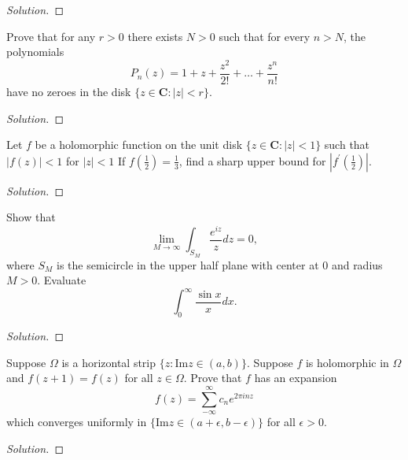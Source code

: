 \documentclass[10pt]{article}
\newenvironment{soln}{\begin{proof}[Solution]}{\end{proof}}
\begin{document}
\begin{soln}

\end{soln}



\begin{problem}
[2003 A-I-1]
Prove that for any $r>0$ there exists $N>0$ such that for every $n>N$, the polynomials
$$
P_n(z)=1+z+\frac{z^2}{2 !}+\ldots+\frac{z^n}{n !}
$$
have no zeroes in the disk $\{z \in \mathbf{C}:|z|< r\}$.
\end{problem}

\begin{soln}

\end{soln}



\begin{problem}
[2003 A-I-2]
Let $f$ be a holomorphic function on the unit disk $\{z \in \mathbf{C}:|z|<1\}$ such that $|f(z)|<1$ for $|z|<1$
If $f\left(\frac{1}{2}\right)=\frac{1}{3}$, find a sharp upper bound for $\left|f^{\prime}\left(\frac{1}{2}\right)\right|$.
\end{problem}

\begin{soln}

\end{soln}



\begin{problem}
[2003 A-II-1]
Show that
$$
\lim _{M \rightarrow \infty} \int_{S_M} \frac{e^{iz}}{z} d z=0,
$$
where $S_M$ is the semicircle in the upper half plane with center at 0 and radius $M>0$. Evaluate
$$
\int_0^{\infty} \frac{\sin x}{x} d x .
$$
\end{problem}

\begin{soln}

\end{soln}



\begin{problem}
[2002 J-I-1]
Suppose $\Omega$ is a horizontal strip $\{z: \text{Im} z \in(a, b)\}$. Suppose $f$ is holomorphic in $\Omega$ and $f(z+1)=f(z)$ for all $z \in \Omega$. Prove that $f$ has an expansion
$$
f(z)=\sum_{-\infty}^{\infty} c_n e^{2 \pi i n z}
$$
which converges uniformly in $\{\text{Im} z \in(a+\epsilon, b-\epsilon)\}$ for all $\epsilon>0$.
\end{problem}

\begin{soln}

\end{soln}
\end{document}
